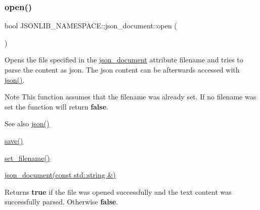\subsubsection{\texorpdfstring{open()}{open()}\hspace{0.1cm}{\footnotesize\ttfamily [2/2]}}
{\footnotesize\ttfamily bool J\+S\+O\+N\+L\+I\+B\+\_\+\+N\+A\+M\+E\+S\+P\+A\+C\+E\+::json\+\_\+document\+::open (\begin{DoxyParamCaption}{ }\end{DoxyParamCaption})}



Opens the file specified in the \hyperlink{classJSONLIB__NAMESPACE_1_1json__document}{json\+\_\+document} attribute {\ttfamily filename} and tries to parse the content as json. The json content can be afterwards accessed with \hyperlink{classJSONLIB__NAMESPACE_1_1json__document_ad87b8e7d68ba854dbd730758273a3b93}{json()}. 

\begin{DoxyNote}{Note}
This function assumes that the {\ttfamily filename} was already set. If no {\ttfamily filename} was set the function will return {\bfseries false}. 
\end{DoxyNote}
\begin{DoxySeeAlso}{See also}
\hyperlink{classJSONLIB__NAMESPACE_1_1json__document_ad87b8e7d68ba854dbd730758273a3b93}{json()} 

\hyperlink{classJSONLIB__NAMESPACE_1_1json__document_af8f392a0ffc779277ead1f2bdb222930}{save()} 

\hyperlink{classJSONLIB__NAMESPACE_1_1json__document_acc406344661e361c75ac7bc307057712}{set\+\_\+filename()} 

\hyperlink{classJSONLIB__NAMESPACE_1_1json__document_a3295c12f7251f1df5dc5f727a4e5b597}{json\+\_\+document(const std\+::string \&)} 
\end{DoxySeeAlso}
\begin{DoxyReturn}{Returns}
{\bfseries true} if the file was opened successfully and the text content was successfully parsed. Otherwise {\bfseries false}. 
\end{DoxyReturn}
\mbox{\label{classJSONLIB__NAMESPACE_1_1json__document_af8f392a0ffc779277ead1f2bdb222930}} 
